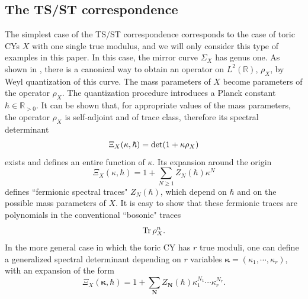 \documentclass[a4paper,11pt]{article}
\theoremstyle{definition}
\def\IR{{\mathbb R}}
\newcommand{\tr}{{\rm Tr}}
\def\bN{{\boldsymbol{N}}}
\begin{document}
\subsection{The TS/ST correspondence}
\label{tsst-subsec}

The simplest case of the TS/ST correspondence corresponds to the case of toric CYs $X$ with one  
single true modulus, and we will only consider this type of 
examples in this paper. In this case, the mirror curve $\Sigma_X$ has genus one. As shown in 
\cite{ghm}, there is a canonical way to obtain an operator on $L^2(\IR)$, 
$\rho_X$, by Weyl quantization of this curve. The mass parameters of $X$ become parameters of the operator $\rho_X$. 
The quantization procedure introduces a Planck constant $\hbar \in \IR_{>0}$. It can be shown that, for 
appropriate values of the mass parameters, the operator $\rho_X$ is 
self-adjoint and of trace class, therefore its spectral determinant
%
\begin{equation}
\label{spec-det}
\Xi_X (\kappa, \hbar)= {\rm det}(1+ \kappa \rho_X)
\end{equation}
%
exists and defines an entire function of $\kappa$. Its expansion around the origin
%
\begin{equation}
\Xi_X (\kappa, \hbar)= 1+ \sum_{N \ge 1} Z_N (\hbar) \kappa^N 
\end{equation}
%
defines ``fermionic spectral traces" $Z_N(\hbar)$, which depend on $\hbar$ and on the possible mass parameters of $X$. It is easy to show that these fermionic traces are polynomials in the conventional ``bosonic" traces 
%
\begin{equation}
\tr \, \rho_X^n. 
\end{equation}
%
In the more general case in which the toric CY has $r$ true moduli, one can define a generalized spectral determinant depending on $r$ variables 
$\boldsymbol{\kappa}=(\kappa_1, \cdots, \kappa_r)$, with an expansion of the form \cite{cgm,cgum}
%
\begin{equation}
\Xi_X (\boldsymbol{\kappa},  \hbar)= 1+ \sum_{\bN } Z_{\bN}(\hbar) \kappa_1^{N_1} \cdots \kappa_r^{N_r}. 
\end{equation}
%
\end{document}
